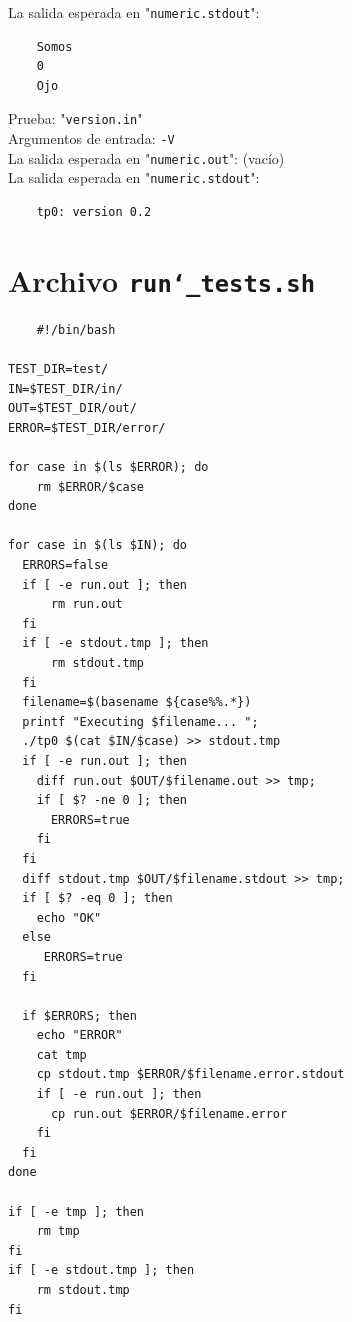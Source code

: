 \documentclass[a4paper,10pt]{article}
\begin{document}
    La salida esperada en "\texttt{numeric.stdout}": \\
            \begin{Verbatim}
    Somos
    0
    Ojo
    \end{Verbatim}
    
       Prueba: "\texttt{version.in}" \\
    Argumentos de entrada: \texttt{-V}\\
    
    La salida esperada en "\texttt{numeric.out}": (vacío)\\

    La salida esperada en "\texttt{numeric.stdout}": \\
    \begin{Verbatim}
    tp0: version 0.2
    \end{Verbatim}
    
    \section{Archivo \texttt{run\char`_tests.sh}}
    \begin{lstlisting}
    #!/bin/bash

TEST_DIR=test/
IN=$TEST_DIR/in/
OUT=$TEST_DIR/out/
ERROR=$TEST_DIR/error/

for case in $(ls $ERROR); do
    rm $ERROR/$case
done

for case in $(ls $IN); do
  ERRORS=false
  if [ -e run.out ]; then 
      rm run.out
  fi
  if [ -e stdout.tmp ]; then
      rm stdout.tmp
  fi
  filename=$(basename ${case%%.*}) 
  printf "Executing $filename... ";
  ./tp0 $(cat $IN/$case) >> stdout.tmp 
  if [ -e run.out ]; then
    diff run.out $OUT/$filename.out >> tmp;
    if [ $? -ne 0 ]; then
      ERRORS=true
    fi
  fi
  diff stdout.tmp $OUT/$filename.stdout >> tmp;
  if [ $? -eq 0 ]; then
    echo "OK"
  else
     ERRORS=true
  fi
  
  if $ERRORS; then
    echo "ERROR"
    cat tmp
    cp stdout.tmp $ERROR/$filename.error.stdout
    if [ -e run.out ]; then
      cp run.out $ERROR/$filename.error
    fi
  fi    
done

if [ -e tmp ]; then
    rm tmp
fi
if [ -e stdout.tmp ]; then
    rm stdout.tmp
fi
    \end{lstlisting}
  
    \newpage
   
\end{document}
